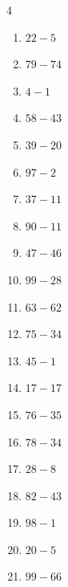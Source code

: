 \begin{multicols}{4}
\begin{enumerate}
  \item $22-5$
        \phantom{$=17$}

  \item $79-74$
        \phantom{$=5$}

\columnbreak %

\resetques

  \item $4-1$
        \phantom{$=3$}

  \item $58-43$
        \phantom{$=15$}

  \item $39-20$
        \phantom{$=19$}

  \item $97-2$
        \phantom{$=95$}

  \item $37-11$
        \phantom{$=26$}

  \item $90-11$
        \phantom{$=79$}

  \item $47-46$
        \phantom{$=1$}

  \item $99-28$
        \phantom{$=71$}

  \item $63-62$
        \phantom{$=1$}

  \item $75-34$
        \phantom{$=41$}

  \item $45-1$
        \phantom{$=44$}

  \item $17-17$
        \phantom{$=0$}

  \item $76-35$
        \phantom{$=41$}

  \item $78-34$
        \phantom{$=44$}

  \item $28-8$
        \phantom{$=20$}

  \item $82-43$
        \phantom{$=39$}

  \item $98-1$
        \phantom{$=97$}

  \item $20-5$
        \phantom{$=15$}

  \item $99-66$
        \phantom{$=33$}


\end{enumerate}
\end{multicols}
